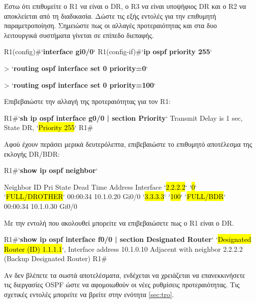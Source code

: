 \documentclass{EdipyLabs} %
\begin{document}
Έστω ότι επιθυμείτε ο R1 να είναι ο DR, ο R3 να είναι υποψήφιος DR και ο R2 να αποκλείεται από τη διαδικασία. Δώστε τις εξής εντολές για την επιθυμητή παραμετροποίηση. Σημειώστε πως οι αλλαγές προτεραιότητας και στα δυο λειτουργικά συστήματα γίνεται σε επίπεδο διεπαφής.

\begin{CommandBox}
R1(config)#`\textbf{interface gi0/0}`
R1(config-if)#`\textbf{ip ospf priority 255}`
\end{CommandBox}

\begin{CommandBox}
[admin@R2] > `\textbf{routing ospf interface set 0 priority=0}`
\end{CommandBox}

\begin{CommandBox}
[admin@R3] > `\textbf{routing ospf interface set 0 priority=100}`
\end{CommandBox}

Επιβεβαιώστε την αλλαγή της προτεραιότητας για τον R1:

\begin{CommandBox}
R1#`\textbf{sh ip ospf interface g0/0 | section Priority}`
Transmit Delay is 1 sec, State DR, `\hl{Priority 255}`
R1#
\end{CommandBox}

Αφού έχουν περάσει μερικά δευτερόλεπτα, επιβεβαιώστε το επιθυμητό αποτέλεσμα της εκλογής DR/BDR:

\begin{CommandBox}
R1#`\textbf{show ip ospf neighbor}`

Neighbor ID    Pri   State           Dead Time   Address       Interface
`\hl{2.2.2.2}`          `\hl{0}`   `\hl{FULL/DROTHER}`    00:00:34    10.1.0.20     Gi0/0
`\hl{3.3.3.3}`        `\hl{100}`   `\hl{FULL/BDR}`        00:00:34    10.1.0.30     Gi0/0
\end{CommandBox}

Με την εντολή που ακολουθεί μπορείτε να επιβεβαιώσετε πως ο R1 είναι ο DR.
\begin{CommandBox}
R1#`\textbf{show ip ospf interface f0/0 | section Designated Router}`
 `\hl{Designated Router (ID) 1.1.1.1}`, Interface address 10.1.0.10
 Adjacent with neighbor 2.2.2.2  (Backup Designated Router)
R1#
\end{CommandBox}

Αν δεν βλέπετε τα σωστά αποτελέσματα, ενδέχεται να χρειάζεται να επανεκκινήσετε τις διεργασίες OSPF ώστε να αφομοιωθούν οι νέες ρυθμίσεις προτεραιότητας. Τις σχετικές εντολές μπορείτε να βρείτε στην ενότητα \ref{sec:tro}.
\end{document}

